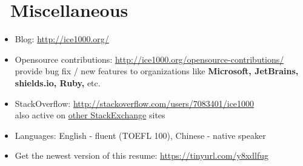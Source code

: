 \documentclass{resume}
\begin{document}
\section{\faInfo\ Miscellaneous}
\begin{itemize}[parsep=0.5ex]
  \item Blog: \url{http://ice1000.org/}
  \item Opensource contributions: \url{http://ice1000.org/opensource-contributions/} \\
    provide bug fix / new features to organizations like \textbf{Microsoft, JetBrains, shields.io, Ruby,} etc.
  \item StackOverflow: \url{http://stackoverflow.com/users/7083401/ice1000} \\
    also active on \href{https://stackexchange.com/users/9532102/ice1000} {other StackExchange} sites
  \item Languages: English - fluent (TOEFL 100), Chinese - native speaker
  \item Get the newest version of this resume: \url{https://tinyurl.com/y8xdlfug}
\end{itemize}

%
%
\end{document}
